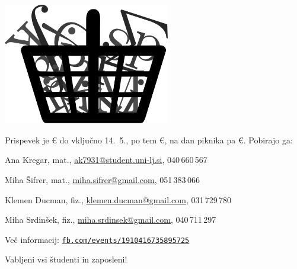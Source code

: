 \documentclass[a4paper,oneside,12pt]{article}
\title{\Title}
\author{\Author}
\date{\today}
\theoremstyle{definition}
\newenvironment{itemize*}{\vspace{-6pt}\begin{itemize}\setlength{\itemsep}{0pt}\setlength{\parskip}{2pt}}{\end{itemize}}
\begin{document}
\vspace*{-10ex}

\begin{center}
\fontsize{64}{64}\selectfont
{}\scalebox{2.6}{$\boldsymbol \varphi$}\textbf{} \\[28px]

\vspace*{1ex}

\fontsize{36}{55}\selectfont
{}\mbox{
 }

\fontsize{32}{36}\selectfont

\vspace*{-0.5ex}
\includegraphics[height=150pt]{piknik_logo.pdf}

\vspace{-1ex}
\begin{flushleft}
  Prispevek je \unit[10]{\euro} do vključno 14.~5., po tem
  \unit[12]{\euro}, na dan piknika pa \unit[13]{\euro}. Pobirajo ga:
\end{flushleft}
\fontsize{18}{20}\selectfont
\vspace{-3.5ex}
\begin{itemize*}
  \item Ana Kregar, mat.,
    \href{mailto:ak7931@student.uni-lj.si}{ak7931@student.uni-lj.si},
    040\,660\,567
  \item Miha Šifrer, mat.,
    \href{mailto:miha.sifrer@gmail.com}{miha.sifrer@gmail.com}, 051\,383\,066
  \item Klemen Ducman, fiz.,
    \href{mailto:klemen.ducman@gmail.com}{klemen.ducman@gmail.com}, 031\,729\,780
  \item Miha Srdinšek, fiz.,
    \href{mailto:miha.srdinsek@gmail.com}{miha.srdinsek@gmail.com},
    040\,711\,297
\end{itemize*}

\vspace{-2ex}

\fontsize{18}{20}\selectfont
Več informacij:
\href{https://www.facebook.com/events/1910416735895725/}{\texttt{fb.com/events/1910416735895725}}

\fontsize{36}{36}\selectfont
\vspace*{-1ex}
Vabljeni vsi študenti in zaposleni!

\end{center}
\end{document}
